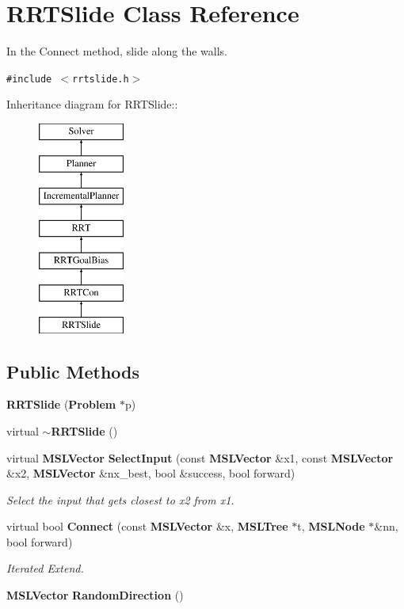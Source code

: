 \section{RRTSlide  Class Reference}
\label{classRRTSlide}
In the Connect method, slide along the walls. 


{\tt \#include $<$rrtslide.h$>$}

Inheritance diagram for RRTSlide::\begin{figure}[H]
\begin{center}
\leavevmode
\includegraphics[height=7cm]{classRRTSlide}
\end{center}
\end{figure}
\subsection*{Public Methods}
\begin{CompactItemize}
\item 
{\bf RRTSlide} ({\bf Problem} $\ast$p)
\item 
virtual {\bf $\sim$RRTSlide} ()
\item 
virtual {\bf MSLVector} {\bf Select\-Input} (const {\bf MSLVector} \&x1, const {\bf MSLVector} \&x2, {\bf MSLVector} \&nx\_\-best, bool \&success, bool forward)
\begin{CompactList}\small\item\em Select the input that gets closest to x2 from x1.\item\end{CompactList}\item 
virtual bool {\bf Connect} (const {\bf MSLVector} \&x, {\bf MSLTree} $\ast$t, {\bf MSLNode} $\ast$\&nn, bool forward)
\begin{CompactList}\small\item\em Iterated Extend.\item\end{CompactList}\item 
{\bf MSLVector} {\bf Random\-Direction} ()
\end{CompactItemize}
